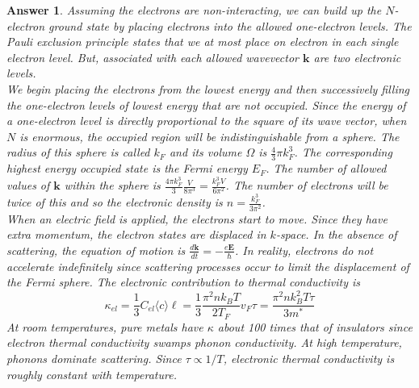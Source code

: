 \documentclass[a4paper]{article}
\newtheorem{ans}{Answer}[subsection]
\theoremstyle{new}
\begin{document}
\begin{ans}
Assuming the electrons are non-interacting, we can build up the $N$-electron ground state by placing electrons into the allowed one-electron levels. The Pauli exclusion principle states that we at most place on electron in each single electron level. But, associated with each allowed wavevector $\mathbf{k}$ are two electronic levels.\\[5pt]
We begin placing the electrons from the lowest energy and then successively filling the one-electron levels of lowest energy that are not occupied. Since the energy of a one-electron level is directly proportional to the square of its wave vector, when $N$ is enormous, the occupied region will be indistinguishable from a sphere. The radius of this sphere is called $k_F$ and its volume $\Omega$ is $\frac{4}{3}\pi k_F^3$. The corresponding highest energy occupied state is the Fermi energy $E_F$. The number of allowed values of $\mathbf{k}$ within the sphere is $\frac{4\pi k_F^3}{3}\frac{V}{8\pi^3}=\frac{k_F^3V}{6\pi^2}$. The number of electrons will be twice of this and so the electronic density is $n=\frac{k_F^3}{3\pi^2}$.\\[5pt]
When an electric field is applied, the electrons start to move. Since they have extra momentum, the electron states are displaced in $k$-space. In the absence of scattering, the equation of motion is $\frac{d\mathbf{k}}{dt}=-\frac{e\mathbf{E}}{\hbar}$. In reality, electrons do not accelerate indefinitely since scattering processes occur to limit the displacement of the Fermi sphere. The electronic contribution to thermal conductivity is
$$\kappa_{el}=\frac{1}{3}C_{el}\langle c\rangle\ell=\frac{1}{3}\frac{\pi^2nk_BT}{2T_F}v_F\tau=\frac{\pi^2nk_B^2T\tau}{3m^*}$$
At room temperatures, pure metals have $\kappa$ about 100 times that of insulators since electron thermal conductivity swamps phonon conductivity. At high temperature, phonons dominate scattering. Since $\tau\propto 1/T$, electronic thermal conductivity is roughly constant with temperature.

\end{ans}
\end{document}
